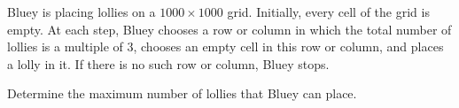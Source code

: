 Bluey is placing lollies on a $1000\times1000$ grid. Initially, every cell of the grid is empty. At each step, Bluey chooses a row or column in which the total number of lollies is a multiple of $3$, chooses an empty cell in this row or column, and places a lolly in it. If there is no such row or column, Bluey stops.

Determine the maximum number of lollies that Bluey can place.
